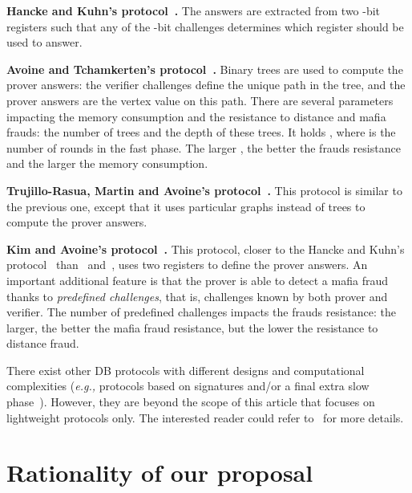 \documentclass{llncs}
\begin{document}
\noindent\textbf{Hancke and Kuhn's protocol~\cite{Hancke:2005:RDB:1128018.1128472}.} The answers are extracted from two -bit registers such that any of the  -bit challenges determines which register should be used to answer. 

\noindent\textbf{Avoine and Tchamkerten's protocol~\cite{AvoineT-2009-isc}.} 
Binary trees are used to compute the prover answers: the verifier challenges 
define the unique path in the tree, and the prover answers are the vertex value 
on this path. There are several parameters impacting the memory consumption and 
the resistance to distance and mafia frauds:  the number of trees and  
the depth of these trees. It holds , where  is the number of 
rounds in the fast phase. The larger , the better the frauds resistance and 
the larger the memory consumption. 

\noindent\textbf{Trujillo-Rasua, Martin and Avoine's protocol~\cite{Trujillo-Rasua:2010:PDP:1926325.1926352}.} This protocol is similar to the previous one, except that it uses particular graphs instead of trees to compute the prover answers.

\noindent\textbf{Kim and Avoine's protocol~\cite{KimA-2011-ieeetwc}.} This 
protocol, closer to the Hancke and Kuhn's 
protocol~\cite{Hancke:2005:RDB:1128018.1128472} than~\cite{AvoineT-2009-isc} 
and~\cite{Trujillo-Rasua:2010:PDP:1926325.1926352}, uses two registers to 
define the prover answers. An important additional feature is that the prover 
is able to detect a mafia fraud thanks to \emph{predefined challenges}, that 
is, challenges known by both prover and verifier. The number of predefined 
challenges impacts the frauds resistance: the larger, the better the mafia 
fraud resistance, but the lower the resistance to distance fraud.



There exist other DB protocols with different designs and computational 
complexities (\emph{e.g.,} protocols based on signatures and/or a final extra 
slow 
phase~\cite{Brands:1994:DP:188307.188361,Singelee:2007:DBN:1784404.1784415}). 
However, they are beyond the scope of this article that focuses on lightweight 
protocols only. The interested reader could refer to~\cite{AvoineBKLM-2011-jcs} 
for more details.


\section{Rationality of our proposal}\label{sec:rationality}
\end{document}
